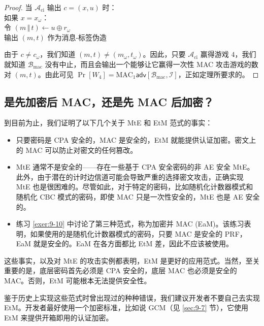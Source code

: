 \begin{proof}
\vspace*{5pt}

\hspace*{5pt} 当 $\mathcal{A}_\mathrm{ci}$ 输出 $c=(x,u)$ 时：\\
\hspace*{50pt} 如果 $x=x_\omega$：\\
\hspace*{75pt} 令 $(m\,\Vert\,t)\leftarrow u\oplus r_\omega$\\
\hspace*{75pt} 输出 $(m,t)$ 作为消息-标签伪造

\vspace*{10pt}

\noindent
由于 $c\neq c_\omega$，我们知道 $(m,t)\neq(m_\omega,t_\omega)$。因此，只要 $\mathcal{A}_\mathrm{ci}$ 赢得游戏 $4$，我们就知道 $\mathcal{B}_\mathrm{mac}$ 没有中止，而且会输出一个能够让它赢得一次性 MAC 攻击游戏的数对 $(m,t)$。由此可见 $\Pr[W_4]=\mathrm{MAC}_1\mathsf{adv}[\mathcal{B}_\mathrm{mac},\mathcal{I}]$，正如定理所要求的。
\end{proof}

\subsection{是先加密后 MAC，还是先 MAC 后加密？}\label{subsec:9-4-5}

到目前为止，我们证明了以下几个关于 MtE 和 EtM 范式的事实：
\begin{itemize}
	\item 只要密码是 CPA 安全的，MAC 是安全的，EtM 就能提供认证加密。密文上的 MAC 可以防止对密文的任何篡改。
	\item MtE 通常不是安全的——存在一些基于 CPA 安全密码的非 AE 安全 MtE。此外，由于潜在的计时边信道可能会导致严重的选择密文攻击，正确实现 MtE 也是很困难的。尽管如此，对于特定的密码，比如随机化计数器模式和随机化 CBC 模式的密码，即使 MAC 只是一次性安全的，MtE 也是 AE 安全的。
	\item 练习 \ref{exer:9-10} 中讨论了第三种范式，称为加密并 MAC (EaM)。该练习表明，如果使用的是随机化计数器模式的密码，只要 MAC 是安全的 PRF，EaM 就是安全的。EaM 在各方面都比 EtM 差，因此不应该被使用。
\end{itemize}

这些事实，以及对 MtE 的攻击实例都表明，EtM 是更好的应用范式。当然，至关重要的是，底层密码首先必须是 CPA 安全的，底层 MAC 也必须是安全的 MAC。否则，EtM 可能根本无法提供安全性。

鉴于历史上实现这些范式时曾出现过的种种错误，我们建议开发者不要自己去实现 EtM。开发者最好使用一个加密标准，比如说 GCM（见 \ref{sec:9-7} 节），它使用 EtM 来提供开箱即用的认证加密。
